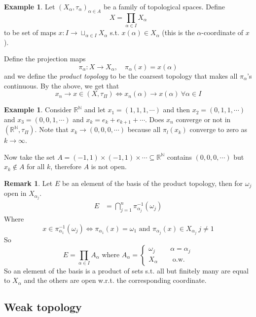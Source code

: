 \documentclass[11pt,a4paper]{article}
\theoremstyle{definition}
\newtheorem{example}[definition]{Example}
\newtheorem{remark}[definition]{Remark}
\theoremstyle{plain}
\theoremstyle{remark}
\newcommand{\R}{\mathbb{R}}
\newcommand{\N}{\mathbb{N}}
\newcommand{\1}{\mathbbm{1}}
\begin{document}
\begin{example}
    Let $(X_\alpha, \tau_\alpha)_{\alpha \in A}$ be a family of topological spaces. Define 
    $$X = \prod_{\alpha \in I} X_\alpha$$
    to be set of maps $x \colon I \to \sqcup_{\alpha \in I} X_\alpha$ s.t. $x(\alpha) \in X_\alpha$ (this is the $\alpha$-coordinate of $x$).
    
    Define the projection maps 
    $$\pi_\alpha \colon X \to X_\alpha, \quad \pi_\alpha(x) = x(\alpha)$$
    and we define the \emph{product topology} to be the coarsest topology that makes all $\pi_\alpha$'s continuous. By the above, we get that 
    $$x_n \to x \in (X, \tau_\Pi) \iff x_n(\alpha) \to x(\alpha) \ \forall \alpha \in I$$
\end{example}

\begin{example}
    Consider $\R^\N$ and let $x_1 = (1,1,1,\cdots)$ and then $x_2 = (0,1,1,\cdots)$ and $x_3 = (0,0,1,\cdots)$ and 
    $x_k = e_k + e_{k+1} + \cdots$. Does $x_n$ converge or not in $(\R^\N, \tau_\Pi)$. Note that 
    $x_k \to (0,0,0,\cdots)$ because all $\pi_l(x_k)$ converge to zero as $k \to \infty$. 

    Now take the set $A = (-1, 1) \times (-1, 1) \times \cdots \subseteq \R^\N$ contains $(0,0,0,\cdots)$ but 
    $x_k \not\in A$ for all $k$, therefore $A$ is not open. 
\end{example}

\begin{remark}
    Let $E$ be an element of the basis of the product topology, then for $\omega_j$ open in $X_{\alpha_j}$. 
    \begin{align*}
        E &= \bigcap_{j=1}^n \pi_{\alpha_j}^{-1} (\omega_j)
    \end{align*}
    Where
    $$x \in \pi_{\alpha_1}^{-1} (\omega_j) \iff \pi_{\alpha_1}(x) = \omega_1 \text{ and } \pi_{\alpha_j} (x) \in X_{\alpha_j} \ j \ne 1$$
    So 
    $$E = \prod_{\alpha \in I} A_\alpha \text{ where } A_\alpha = \begin{cases}
        \omega_j \quad & \alpha = \alpha_j\\
        X_\alpha \quad &\text{ o.w. }
    \end{cases}$$
    So an element of the basis is a product of sets s.t. all but finitely many are equal to $X_\alpha$ and the others are open w.r.t. the corresponding coordinate. 
\end{remark}

\subsection{Weak topology} 
\end{document}
